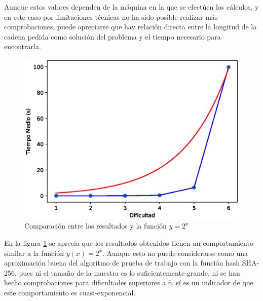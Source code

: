 Aunque estos valores dependen de la máquina en la que se efectúen los cálculos, y en este caso por limitaciones técnicas no ha sido posible realizar más comprobaciones, puede apreciarse que hay relación directa entre la longitud de la cadena pedida como solución del problema y el tiempo necesario para encontrarla.

\begin{figure}[H]
  \includegraphics[width=12cm]{figures/resultados_pow.eps}
  \caption{Comparación entre los resultados y la función $y = 2^x$}
  \label{fig:resultados}
\end{figure}
En la figura \ref{fig:resultados} se aprecia que los resultados obtenidos tienen un comportamiento similar a la función $y(x) = 2^x$. Aunque esto no puede considerarse como una aproximación buena del algoritmo de prueba de trabajo con la función hash SHA-256, pues ni el tamaño de la muestra es lo suficientemente grande, ni se han hecho comprobaciones para dificultades superiores a 6, sí es un indicador de que este comportamiento es cuasi-exponencial.
